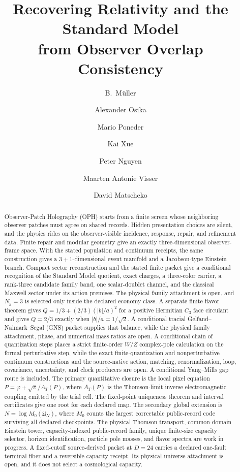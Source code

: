 \documentclass[11pt]{article}
\title{Recovering Relativity and the Standard Model\\
from Observer Overlap Consistency}
\author{B.\ M\"uller \and Alexander Osika \and Mario Poneder \and Kai Xue \and Peter Nguyen \and Maarten Antonie Visser \and David Matscheko}
\date{\OPHPaperReleaseDate}
\begin{document}
\maketitle
\OPHPaperReleaseBanner

\begin{abstract}
Observer-Patch Holography (OPH) starts from a finite screen whose neighboring observer
patches must agree on shared records. Hidden presentation choices are silent, and
the physics rides on the observer-visible incidence, response, repair, and
refinement data. Finite repair and modular geometry give an
exactly three-dimensional observer-frame space. With the stated population and
continuum receipts, the same construction gives a \(3{+}1\)-dimensional event
manifold and a Jacobson-type Einstein branch. Compact sector reconstruction
and the stated finite packet give a conditional recognition of the Standard
Model quotient, exact charges, a three-color carrier, a rank-three candidate
family band, one scalar-doublet channel, and the classical Maxwell sector under
its action premises. The physical family attachment is open, and \(N_g=3\) is
selected only inside the declared economy class.
A separate finite flavor theorem gives
\(Q=1/3+(2/3)(|b|/a)^2\) for a positive Hermitian \(C_3\) face circulant and
gives \(Q=2/3\) exactly when \(|b|/a=1/\sqrt2\). A conditional tracial
Gelfand--Naimark--Segal (GNS) packet supplies that balance, while the physical family attachment, phase,
and numerical mass ratios are open.
A conditional chain of quantization steps
places a strict finite-order \(W/Z\) complex-pole calculation on the formal
perturbative step, while the exact finite-quantization and nonperturbative continuum
constructions and the source-native action, matching, renormalization,
loop, covariance, uncertainty, and clock producers are open.
A conditional
Yang--Mills gap route is included. The primary quantitative closure is the local pixel
equation \(P=\varphi+\sqrt\pi/A_T(P)\), where \(A_T(P)\) is the Thomson-limit
inverse electromagnetic coupling emitted by the trial cell. The fixed-point
uniqueness theorem and interval certificates give one root for each declared map. The
secondary global extension is \(N=\log M_0(\mathfrak U_N)\), where \(M_0\) counts the
largest correctable public-record code surviving all declared checkpoints.
The physical Thomson transport, common-domain Einstein tower, capacity-indexed
public-record family, unique finite-size capacity selector, horizon
identification, particle pole masses, and flavor spectra are work in progress.
A fixed-cutoff source-derived packet at \(D=24\) carries a declared one-fault
terminal fiber and a reversible capacity receipt. Its physical-universe
attachment is open, and it does not select a cosmological capacity.
\end{abstract}
\end{document}
